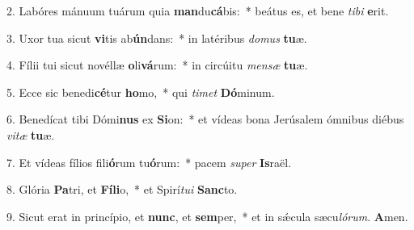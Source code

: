2. Labóres mánuum tuárum quia \textbf{man}du\textbf{cá}bis:~*  beátus es, et bene \textit{ti}\textit{bi} \textbf{e}rit.\

3. Uxor tua sicut \textbf{vi}tis ab\textbf{ún}dans:~*  in latéribus \textit{do}\textit{mus} \textbf{tu}æ.\

4. Fílii tui sicut novéllæ \textbf{o}li\textbf{vá}rum:~*  in circúitu \textit{men}\textit{sæ} \textbf{tu}æ.\

5. Ecce sic benedi\textbf{cé}tur \textbf{ho}mo,~*  qui \textit{ti}\textit{met} \textbf{Dó}minum.\

6. Benedícat tibi Dómi\textbf{nus} ex \textbf{Si}on:~*  et vídeas bona Jerúsalem ómnibus diébus \textit{vi}\textit{tæ} \textbf{tu}æ.\

7. Et vídeas fílios fili\textbf{ó}rum tu\textbf{ó}rum:~*  pacem \textit{su}\textit{per} \textbf{Is}raël.\

8. Glória \textbf{Pa}tri, et \textbf{Fí}\textbf{li}o,~*  et Spirí\textit{tu}\textit{i} \textbf{Sanc}to.\

9. Sicut erat in princípio, et \textbf{nunc}, et \textbf{sem}per,~*  et in sǽcula sæcu\textit{ló}\textit{rum}. \textbf{A}men.\

